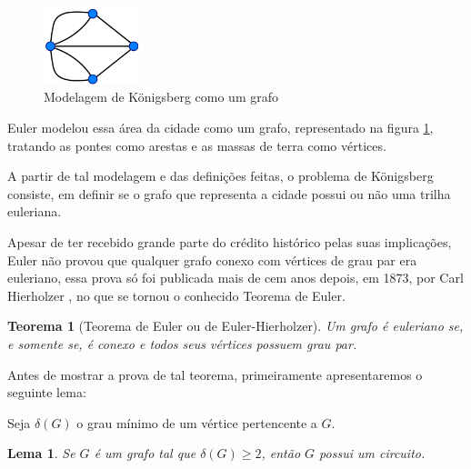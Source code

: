 \documentclass[12pt, a4paper]{article}
\newtheorem{theorem}{Teorema}[section]
\newtheorem{lemma}{Lema}
\begin{document}
\begin{figure}
    \centering
    \includegraphics[width=0.25\textwidth]{konigsberg-graph.png}
    \caption{Modelagem de Königsberg como um grafo}
    \label{konigsberg-graph}
\end{figure}

Euler modelou essa área da cidade como um grafo, representado na figura \ref{konigsberg-graph}, tratando as pontes como arestas e as massas de terra como vértices.

A partir de tal modelagem e das definições feitas, o problema de Königsberg consiste, em definir se o grafo que representa a cidade possui ou não uma trilha euleriana. 

Apesar de ter recebido grande parte do crédito histórico pelas suas implicações, Euler não provou que qualquer grafo conexo com vértices de grau par era euleriano, essa prova só foi publicada mais de cem anos depois, em 1873, por Carl Hierholzer \cite{hierholzer}, no que se tornou o conhecido Teorema de Euler.


\begin{theorem}[Teorema de Euler ou de Euler-Hierholzer]
    Um grafo é euleriano se, e somente se, é conexo e todos seus vértices possuem grau par.
    \label{euler}
\end{theorem}

Antes de mostrar a prova de tal teorema, primeiramente apresentaremos o seguinte lema:

Seja $\delta(G)$ o grau mínimo de um vértice pertencente a $G$.

\begin{lemma}
	\label{lema}
	Se $G$ é um grafo tal que $\delta(G) \geq 2$, então $G$ possui um circuito.
\end{lemma}
\end{document}

